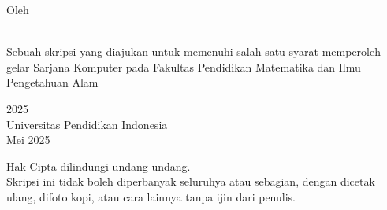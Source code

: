 \newpage
{}

\begin{center}
    \doublespacing
    \textbf{\MakeUppercase{\judul}}
\end{center}

\begin{center}
    Oleh\\
    \penulis\\[6em]
\end{center}
\begin{center}
    Sebuah skripsi yang diajukan untuk memenuhi salah satu syarat memperoleh gelar Sarjana Komputer pada Fakultas Pendidikan Matematika dan Ilmu Pengetahuan Alam\\
\end{center}
\vfill
\begin{center}
    \textcopyright{} \penulis{} 2025\\
    Universitas Pendidikan Indonesia\\
    Mei 2025\\
\end{center}
\vfill 
\begin{center}
    Hak Cipta dilindungi undang-undang.\\
    Skripsi ini tidak boleh diperbanyak seluruhya atau sebagian, dengan dicetak ulang, difoto kopi, atau cara lainnya tanpa ijin dari penulis.\\
\end{center}
